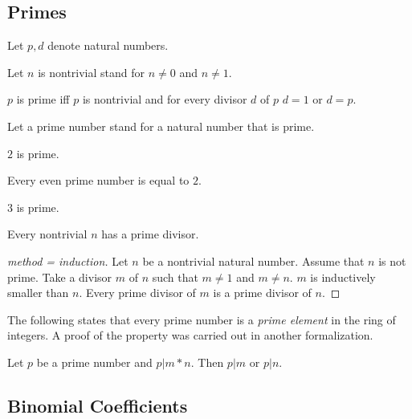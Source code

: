 \documentclass[11pt]{article}
\begin{document}
\subsection{Primes}

\begin{forthel}

Let $p,d$ denote natural numbers.

Let $n$ is nontrivial stand for $n \neq 0$ and $n \neq 1$.

\begin{definition}
$p$ is prime iff $p$ is nontrivial and
for every divisor $d$ of $p$ $d = 1$ or $d = p$.
\end{definition}
Let a prime number stand for a natural number that is prime.

\begin{lemma} $2$ is prime.
\end{lemma}

\begin{lemma}
Every even prime number is equal to $2$.
\end{lemma}

\begin{lemma} $3$ is prime.
\end{lemma}

\begin{lemma}
Every nontrivial $n$ has a prime divisor.
\end{lemma}
\begin{proof}[method = induction]
Let $n$ be a nontrivial natural number.
Assume that $n$ is not prime.
Take a divisor $m$ of $n$ such that $m \neq 1$ and $m \neq n$.
$m$ is inductively smaller than $n$.
Every prime divisor of $m$ is a prime divisor of $n$.
\end{proof}

\end{forthel}

The following states that every prime number is a 
\textit{prime element} in the ring of integers. A proof of
the property was carried out in another \Naproche
formalization.

\begin{forthel}
\begin{axiom}[title = Euclids Lemma]
Let $p$ be a prime number and $p | m * n$.
Then $p | m$ or $p | n$. 
\end{axiom}

\end{forthel}


\subsection{Binomial Coefficients}
\end{document}
